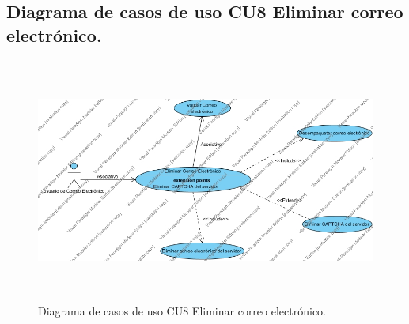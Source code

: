 \pagebreak

\subsection{Diagrama de casos de uso CU8 Eliminar correo electrónico.}
\begin{figure}[H]
	\includegraphics[width=1\linewidth, height=8cm]{./images/casodeuso8.jpg}
	\caption{Diagrama de casos de uso CU8 Eliminar correo electrónico.}
	\label{fig:4-9-1}
\end{figure}
